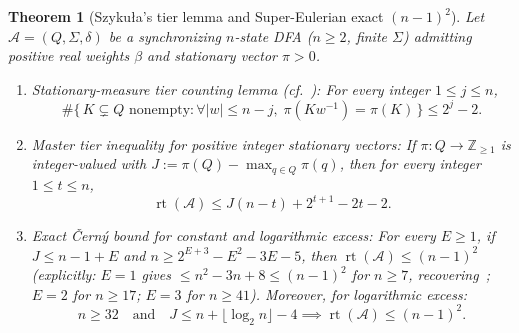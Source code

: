 \documentclass[11pt,a4paper]{article}
\newtheorem{theorem}{Theorem}[section]
\theoremstyle{definition}
\theoremstyle{remark}
\newcommand{\rt}{\operatorname{rt}}
\newcommand{\Z}{\mathbb{Z}}
\newcommand{\cA}{\mathcal{A}}
\begin{document}
\begin{theorem}[Szyku\l a's tier lemma and Super-Eulerian exact $(n-1)^2$]
\label{thm:tier}
Let $\cA = (Q, \Sigma, \delta)$ be a synchronizing $n$-state DFA ($n \ge 2$, finite $\Sigma$) admitting positive real weights $\beta$ and stationary vector $\pi > 0$.
\begin{enumerate}[label=(\arabic*),nosep]
  \item \emph{Stationary-measure tier counting lemma (cf.~\cite{Szykula2026,Goel2026}):} For every integer $1 \le j \le n$,
  \[
    \#\bigl\{\, K \subsetneq Q \text{ nonempty} : \forall |w| \le n - j,\; \pi(K w^{-1}) = \pi(K) \,\bigr\} \le 2^j - 2.
  \]
  \item \emph{Master tier inequality for positive integer stationary vectors:} If $\pi : Q \to \Z_{\ge 1}$ is integer-valued with $J := \pi(Q) - \max_{q \in Q} \pi(q)$, then for every integer $1 \le t \le n$,
  \[
    \rt(\cA) \le J(n - t) + 2^{t+1} - 2t - 2.
  \]
  \item \emph{Exact \v{C}ern\'y bound for constant and logarithmic excess:} For every $E \ge 1$, if $J \le n - 1 + E$ and $n \ge 2^{E+3} - E^2 - 3E - 5$, then $\rt(\cA) \le (n - 1)^2$ (explicitly: $E = 1$ gives $\le n^2 - 3n + 8 \le (n-1)^2$ for $n \ge 7$, recovering~\cite[Cor.]{Goel2026}; $E = 2$ for $n \ge 17$; $E = 3$ for $n \ge 41$). Moreover, for logarithmic excess:
  \[
    n \ge 32 \quad\text{and}\quad J \le n + \lfloor\log_2 n\rfloor - 4 \implies \rt(\cA) \le (n - 1)^2.
  \]
\end{enumerate}
\end{theorem}
\end{document}

